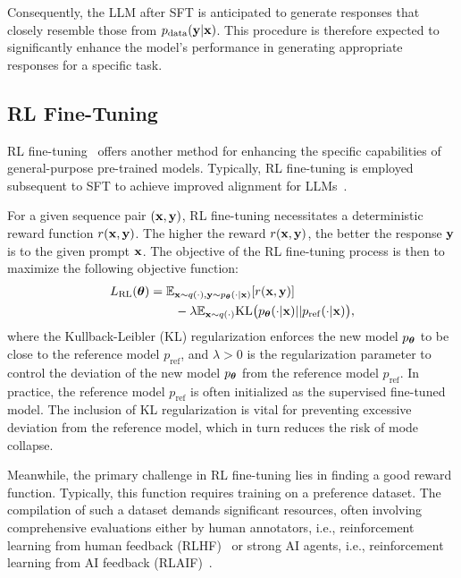\documentclass{article}
\begin{document}
Consequently, the LLM after SFT is anticipated to generate responses that closely resemble those from $p_{\mathrm{data}}(\mathbf{y}|\mathbf{x})$. 
This procedure is therefore expected to significantly enhance the model's performance in generating appropriate responses for a specific task.





\subsection{RL Fine-Tuning}
RL fine-tuning~\citep{christiano2017deep,bai2022training,gao2023scaling} 
offers another method for enhancing the specific capabilities of general-purpose pre-trained models. 
Typically, RL fine-tuning is employed subsequent to SFT to achieve improved alignment for LLMs~\citep{tunstall2023zephyr}. 

For a given sequence pair $(\mathbf{x}, \mathbf{y})$, RL fine-tuning necessitates a deterministic reward function $r(\mathbf{x},\mathbf{y})$. 
The higher the reward $r(\mathbf{x}, \mathbf{y})$, the better the response $\mathbf{y}$ is to the given prompt $\mathbf{x}$. The objective of the RL fine-tuning process is then to maximize the following objective function: 
\begin{align*}
L_{\mathrm{RL}}(\bm{\theta}) &= \mathbb{E}_{\mathbf{x}\sim q(\cdot), \mathbf{y}\sim p_{\bm{\theta}}(\cdot|\mathbf{x})}[r(\mathbf{x},\mathbf{y})]\\
&\qquad- \lambda \mathbb{E}_{\mathbf{x}\sim q(\cdot)}\mathrm{KL}\big(p_{\bm{\theta}}(\cdot|\mathbf{x})||p_{\mathrm{ref}}(\cdot|\mathbf{x})\big),   
\end{align*}
where the Kullback-Leibler (KL) regularization enforces the new model $p_{\bm{\theta}}$ to be close to the reference model $p_{\mathrm{ref}}$, and $\lambda>0$ is the regularization parameter to control the deviation of the new model $p_{\bm{\theta}}$ from the reference model $p_{\mathrm{ref}}$. 
In practice, the reference model $p_{\mathrm{ref}}$ is often initialized as the supervised fine-tuned model. 
The inclusion of KL regularization is vital for preventing excessive deviation from the reference model, which in turn reduces the risk of mode collapse. 

Meanwhile, the primary challenge in RL fine-tuning lies in finding a good reward function. 
Typically, this function requires training on a preference dataset. 
The compilation of such a dataset demands significant resources, often involving comprehensive evaluations either by human annotators, i.e., reinforcement learning from human feedback (RLHF)~\citep{christiano2017deep,bai2022training} or strong AI agents, i.e., reinforcement learning from AI feedback (RLAIF)~\citep{bai2022constitutional}.
\end{document}
